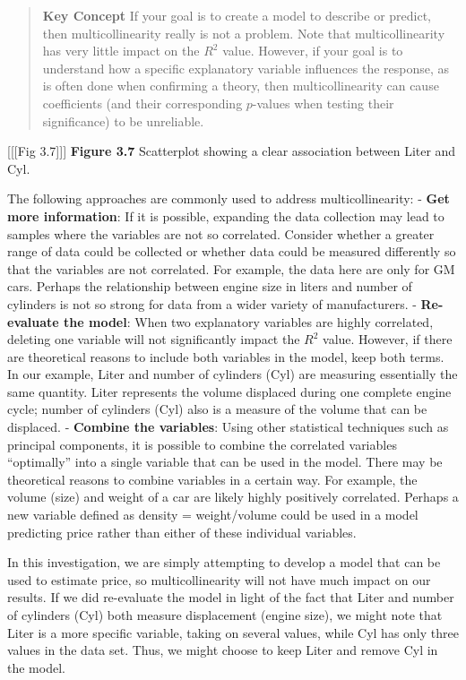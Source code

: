 \documentclass[
]{report}
\begin{document}
\begin{quote}
\textbf{Key Concept}
If your goal is to create a model to describe or predict, then multicollinearity really is not a problem. Note that multicollinearity has very little impact on the \(R^2\) value. However, if your goal is to understand how a specific explanatory variable influences the response, as is often done when confirming a theory, then multicollinearity can cause coefficients (and their corresponding \(p\)-values when testing their significance) to be unreliable.
\end{quote}

{[}{[}{[}Fig 3.7{]}{]}{]}
\textbf{Figure 3.7} Scatterplot showing a clear association between Liter and Cyl.

The following approaches are commonly used to address multicollinearity:
- \textbf{Get more information}: If it is possible, expanding the data collection may lead to samples where the variables are not so correlated. Consider whether a greater range of data could be collected or whether data could be measured differently so that the variables are not correlated. For example, the data here are only for GM cars. Perhaps the relationship between engine size in liters and number of cylinders is not so strong for data from a wider variety of manufacturers.
- \textbf{Re-evaluate the model}: When two explanatory variables are highly correlated, deleting one variable will not significantly impact the \(R^2\) value. However, if there are theoretical reasons to include both variables in the model, keep both terms. In our example, Liter and number of cylinders (Cyl) are measuring essentially the same quantity. Liter represents the volume displaced during one complete engine cycle; number of cylinders (Cyl) also is a measure of the volume that can be displaced.
- \textbf{Combine the variables}: Using other statistical techniques such as principal components, it is possible to combine the correlated variables ``optimally'' into a single variable that can be used in the model. There may be theoretical reasons to combine variables in a certain way. For example, the volume (size) and weight of a car are likely highly positively correlated. Perhaps a new variable defined as density = weight/volume could be used in a model predicting price rather than either of these individual variables.

In this investigation, we are simply attempting to develop a model that can be used to estimate price, so multicollinearity will not have much impact on our results. If we did re-evaluate the model in light of the fact that Liter and number of cylinders (Cyl) both measure displacement (engine size), we might note that Liter is a more specific variable, taking on several values, while Cyl has only three values in the data set. Thus, we might choose to keep Liter and remove Cyl in the model.
\end{document}

